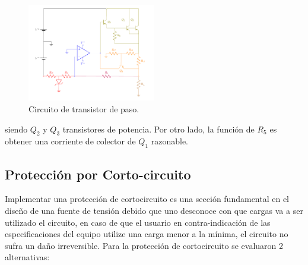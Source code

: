 \begin{figure}[H]
\centering
	\includegraphics[width=0.5\textwidth, page=5]{ImagenesEjercicio2/Regulador.pdf}
	\caption{Circuito de transistor de paso.}
	\label{fig:transistorDePaso}
\end{figure}
siendo $Q_2$ y $Q_3$ transistores de potencia. Por otro lado, la función de $R_5$ es obtener una corriente de colector de $Q_1$ razonable.
\subsection{Protección por Corto-circuito}
Implementar una protección de cortocircuito es una sección fundamental en el diseño de una fuente de tensión debido que uno desconoce con que cargas va  a ser utilizado el circuito, en caso de que el usuario en contra-indicación de las especificaciones del equipo utilize una carga menor a la mínima, el circuito no sufra un daño irreversible. 
Para la protección de cortocircuito se evaluaron 2 alternativas:
